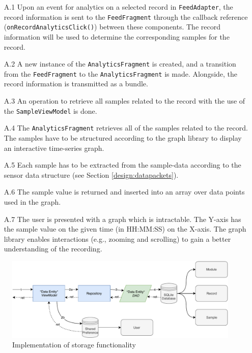 \begin{itemize}
    \item[A.1] Upon an event for analytics on a selected record in \verb|FeedAdapter|, the record information is sent to the \verb|FeedFragment| through the callback reference (\verb|onRecordAnalyticsClick()|) between these components. The record information will be used to determine the corresponding samples for the record.
    \item[A.2] A new instance of the \verb|AnalyticsFragment| is created, and a transition from the \verb|FeedFragment| to the \verb|AnalyticsFragment| is made. Alongside, the record information is transmitted as a bundle.
    \item[A.3] An operation to retrieve all samples related to the record with the use of the \verb|SampleViewModel| is done. 
    \item[A.4] The \verb|AnalyticsFragment| retrieves all of the samples related to the record. The samples have to be structured according to the graph library to display an interactive time-series graph.
    \item[A.5] Each sample has to be extracted from the sample-data according to the sensor data structure (see Section \ref{design:datapackets}).
    \item[A.6] The sample value is returned and inserted into an array over data points used in the graph. 
    \item[A.7] The user is presented with a graph which is intractable. The Y-axis has the sample value on the given time (in HH:MM:SS) on the X-axis. The graph library enables interactions (e.g., zooming and scrolling) to gain a better understanding of the recording. 
\end{itemize}

\begin{figure}[!h]
    \centering
    \includegraphics[scale=0.60]{images/Storage_Imp.pdf}
    \caption{Implementation of storage functionality}
    \label{fig:impl_storage}
\end{figure}


